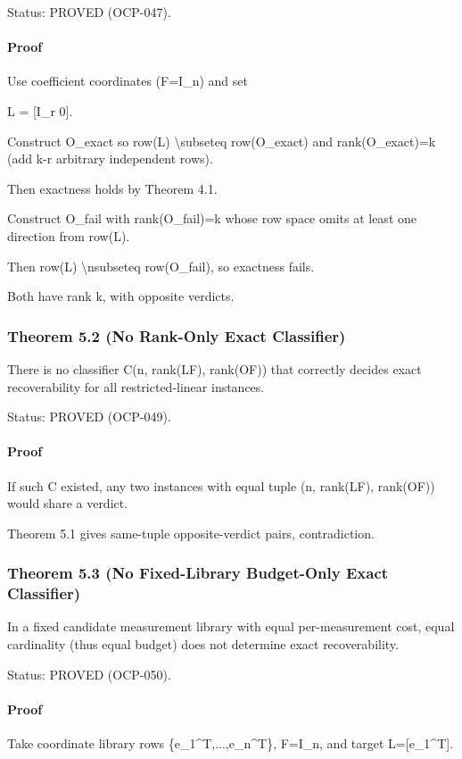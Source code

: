 \documentclass[11pt]{article}
\begin{document}
Status: PROVED (OCP-047).


\paragraph{Proof}
Use coefficient coordinates (F=I\_n) and set


L = [I\_r  0].


Construct O\_exact so row(L) \textbackslash{}subseteq row(O\_exact) and rank(O\_exact)=k (add k-r arbitrary independent rows).

Then exactness holds by Theorem 4.1.


Construct O\_fail with rank(O\_fail)=k whose row space omits at least one direction from row(L).

Then row(L) \textbackslash{}nsubseteq row(O\_fail), so exactness fails.


Both have rank k, with opposite verdicts.


\subsubsection*{Theorem 5.2 (No Rank-Only Exact Classifier)}
There is no classifier C(n, rank(LF), rank(OF)) that correctly decides exact recoverability for all restricted-linear instances.


Status: PROVED (OCP-049).


\paragraph{Proof}
If such C existed, any two instances with equal tuple (n, rank(LF), rank(OF)) would share a verdict.

Theorem 5.1 gives same-tuple opposite-verdict pairs, contradiction.


\subsubsection*{Theorem 5.3 (No Fixed-Library Budget-Only Exact Classifier)}
In a fixed candidate measurement library with equal per-measurement cost, equal cardinality (thus equal budget) does not determine exact recoverability.


Status: PROVED (OCP-050).


\paragraph{Proof}
Take coordinate library rows \{e\_1\textasciicircum{}T,...,e\_n\textasciicircum{}T\}, F=I\_n, and target L=[e\_1\textasciicircum{}T].
\end{document}
